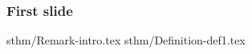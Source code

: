 \documentclass{beamer}
\begin{document}
\begin{frame}
  \frametitle{First slide}
   {sthm/Remark-intro.tex}
   {sthm/Definition-def1.tex}
\end{frame}
\end{document}
